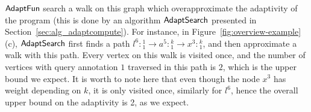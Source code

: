  $\textsf{AdaptFun}$ search a walk on this graph which overapproximate the adaptivity of the program (this is done by an algorithm
 $\mathsf{AdaptSearch}$ presented in  Section~\ref{sec:alg_adaptcompute}). 
For instance, in Figure~\ref{fig:overview-example}(c), $\mathsf{AdaptSearch}$ first finds a path $l^6:{}^1_1 \to a^5: {}^k_1 \to x^3: {}^k_1$, and then approximate a walk with this path.
Every vertex on this walk is visited once, and the number of vertices with query annotation $1$ traversed in this path is $2$, which is the upper bound we expect.
It is worth to note here that even though the node $x^3$ has weight depending on $k$, 
it is only visited once, similarly for $l^6$, hence the overall upper bound on the adaptivity is 2, as we expect.
